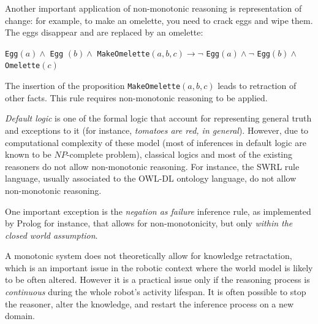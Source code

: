 \documentclass[a4paper, twocolumn]{article}
\newcommand{\concept}[1]{{\footnotesize \texttt{#1}}}
\begin{document}
Another important application of non-monotonic reasoning is representation of
change: for example, to make an omelette, you need to crack eggs and wipe them.
The eggs disappear and are replaced by an omelette:

\concept{Egg}$(a) \wedge $ \concept{Egg} $(b) \wedge $
\concept{MakeOmelette}$(a, b, c) \to \lnot $ \concept{Egg}$(a) \wedge \lnot $
\concept{Egg}$(b) \wedge $ \concept{Omelette}$(c)$

The insertion of the proposition \concept{MakeOmelette}$(a, b, c)$ leads to
retraction of other facts. This rule requires non-monotonic reasoning to be
applied.

\emph{Default logic} is one of the formal logic that account for representing
general truth and exceptions to it (for instance, \emph{tomatoes are red, in
general}). However, due to computational complexity of these model (most of
inferences in default logic are known to be $NP$-complete problem), classical
logics and most of the existing reasoners do not allow non-monotonic reasoning.
For instance, the SWRL rule language, usually associated to the OWL-DL ontology
language, do not allow non-monotonic reasoning.


One important exception is the \emph{negation as failure} inference rule, as
implemented by {\sc Prolog} for instance, that allows for non-monotonicity, but
only \emph{within the closed world assumption}.


A monotonic system does not theoretically allow for knowledge retractation,
which is an important issue in the robotic context where the world model is
likely to be often altered.  However it is a practical issue only if the
reasoning process is \emph{continuous} during the whole robot's activity
lifespan. It is often possible to stop the reasoner, alter the knowledge, and
restart the inference process on a new domain.

\end{document}
